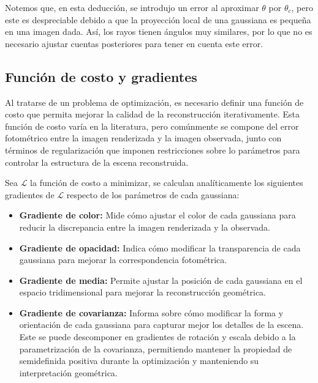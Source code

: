 Notemos que, en esta deducción, se introdujo un error al aproximar $\theta$ por $\theta_c$, pero este es despreciable debido a que la proyección local de una gaussiana es pequeña en una imagen dada. Así, los rayos tienen ángulos muy similares, por lo que no es necesario ajustar cuentas posteriores para tener en cuenta este error.

\subsection{Función de costo y gradientes}

Al tratarse de un problema de optimización, es necesario definir una función de costo que permita mejorar la calidad de la reconstrucción iterativamente. Esta función de costo varía en la literatura, pero comúnmente se compone del error fotométrico entre la imagen renderizada y la imagen observada, junto con términos de regularización que imponen restricciones sobre lo parámetros para controlar la estructura de la escena reconstruida.

Sea $\mathcal{L}$ la función de costo a minimizar, se calculan analíticamente los siguientes gradientes de $\mathcal{L}$ respecto de los parámetros de cada gaussiana:

\begin{itemize}
    \item \textbf{Gradiente de color:} Mide cómo ajustar el color de cada gaussiana para reducir la discrepancia entre la imagen renderizada y la observada.
    
    \item \textbf{Gradiente de opacidad:} Indica cómo modificar la transparencia de cada gaussiana para mejorar la correspondencia fotométrica.
    
    \item \textbf{Gradiente de media:} Permite ajustar la posición de cada gaussiana en el espacio tridimensional para mejorar la reconstrucción geométrica.
    
    \item \textbf{Gradiente de covarianza:} Informa sobre cómo modificar la forma y orientación de cada gaussiana para capturar mejor los detalles de la escena. Este se puede descomponer en gradientes de rotación y escala debido a la parametrización de la covarianza, permitiendo mantener la propiedad de semidefinida positiva durante la optimización y manteniendo su interpretación geométrica.


\end{itemize}

